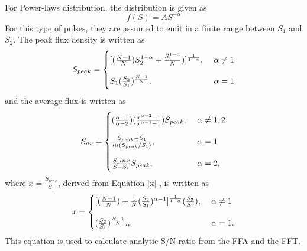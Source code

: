 \documentclass[thesis_msc.tex]{subfiles}
\begin{document}
   \paragraph{} For Power-laws distribution, the distribution is given as 
\begin{equation}
f(S)=AS^{-\alpha} \label{fpower}
\end{equation}
    For this type of pulses, they are assumed to emit in a finite range between $S_1$ and $S_2$. The peak flux density is written as
  \begin{equation}
  S_{peak}=\left\{
    \begin{array}{@{}ll@{}}
    [(\frac{N-1}{N})S_2^{1-\alpha}+\frac{S^{1-\alpha}_1}{N})]^{\frac{1}{1-\alpha}}, & \ \alpha \neq 1 \\ \\
    S_1(\frac{S_2}{S_1})^{\frac{N-1}{N}}, & \ \alpha = 1
  \end{array}\right. \label{Speakpo}
  \end{equation}
and the average flux is written as
  \begin{equation}
  S_{av}=\left\{
    \begin{array}{@{}ll@{}}
    (\frac{\alpha-1}{\alpha-2})(\frac{x^{\alpha-2}-1}{x^{\alpha-1}-1}) S_{peak}, & \ \alpha \neq 1,2 \\ \\
    \frac{S_{peak}-S_1}{ln(S_{peak}/S_1)}, & \ \alpha = 1 \\ \\
    \frac{S_1 ln x}{S-S_1} S_{peak}, & \ \alpha = 2,
  \end{array}\right.
  \end{equation}
  where $x = \frac{S_{peak}}{S_1}$, derived from Equation \ref{x} , is written as 
   \begin{equation}
  x=\left\{
    \begin{array}{@{}ll@{}}
    [(\frac{N-1}{N})+\frac{1}{N}(\frac{S_2}{S_1})^{\alpha-1}]^{\frac{1}{1-\alpha}} (\frac{S_2}{S_1}), & \ \alpha \neq 1 \\ \\
    (\frac{S_2}{S_1})^{\frac{N-1}{N}}., & \ \alpha = 1.
  \end{array}\right. \label{x}
  \end{equation}This equation is used to calculate analytic S/N ratio from the FFA and the FFT.   
\end{document}
